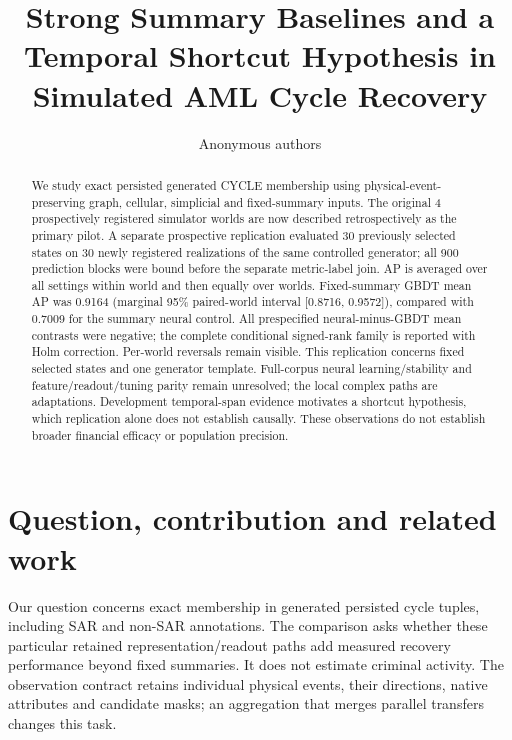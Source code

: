 \documentclass{article}
\title{Strong Summary Baselines and a Temporal Shortcut Hypothesis in Simulated AML Cycle Recovery}
\author{Anonymous authors}
\date{}
\begin{document}
\maketitle
\footnotemark


\begin{abstract}
We study exact persisted generated CYCLE membership using physical-event-preserving graph, cellular, simplicial and fixed-summary inputs. The original 4 prospectively registered simulator worlds are now described retrospectively as the primary pilot. A separate prospective replication evaluated 30 previously selected states on 30 newly registered realizations of the same controlled generator; all 900 prediction blocks were bound before the separate metric-label join. AP is averaged over all settings within world and then equally over worlds. Fixed-summary GBDT mean AP was 0.9164 (marginal 95\% paired-world interval [0.8716, 0.9572]), compared with 0.7009 for the summary neural control. All prespecified neural-minus-GBDT mean contrasts were negative; the complete conditional signed-rank family is reported with Holm correction. Per-world reversals remain visible. This replication concerns fixed selected states and one generator template. Full-corpus neural learning/stability and feature/readout/tuning parity remain unresolved; the local complex paths are adaptations. Development temporal-span evidence motivates a shortcut hypothesis, which replication alone does not establish causally. These observations do not establish broader financial efficacy or population precision.
\end{abstract}
\section{Question, contribution and related work}

Our question concerns exact membership in generated persisted cycle tuples, including SAR and non-SAR annotations. The comparison asks whether these particular retained representation/readout paths add measured recovery performance beyond fixed summaries. It does not estimate criminal activity. The observation contract retains individual physical events, their directions, native attributes and candidate masks; an aggregation that merges parallel transfers changes this task.
\end{document}
